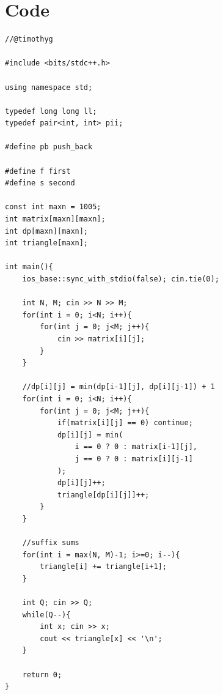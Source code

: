 \documentclass[15pt]{article}
\begin{document}
\section{Code}
\begin{lstlisting}
//@timothyg

#include <bits/stdc++.h>
 
using namespace std;
 
typedef long long ll;
typedef pair<int, int> pii;

#define pb push_back

#define f first
#define s second

const int maxn = 1005;
int matrix[maxn][maxn];
int dp[maxn][maxn];
int triangle[maxn];

int main(){
    ios_base::sync_with_stdio(false); cin.tie(0);
    
    int N, M; cin >> N >> M;
    for(int i = 0; i<N; i++){
        for(int j = 0; j<M; j++){
            cin >> matrix[i][j];
        }
    }

    //dp[i][j] = min(dp[i-1][j], dp[i][j-1]) + 1
    for(int i = 0; i<N; i++){
        for(int j = 0; j<M; j++){
            if(matrix[i][j] == 0) continue;
            dp[i][j] = min(
                i == 0 ? 0 : matrix[i-1][j],    
                j == 0 ? 0 : matrix[i][j-1]
            );  
            dp[i][j]++;
            triangle[dp[i][j]]++;
        }
    }
    
    //suffix sums
    for(int i = max(N, M)-1; i>=0; i--){
        triangle[i] += triangle[i+1];
    }
    
    int Q; cin >> Q;
    while(Q--){
        int x; cin >> x;
        cout << triangle[x] << '\n';
    }

    return 0;
}
\end{lstlisting}
\end{document}
